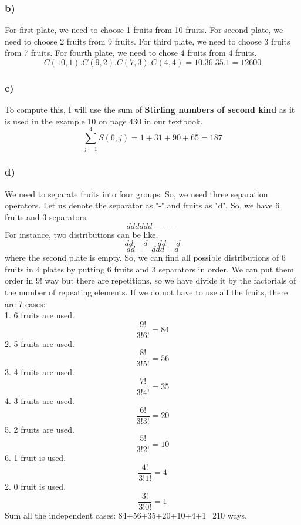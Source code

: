 \documentclass[12pt]{article}
\begin{document}
\subsubsection*{b)}
For first plate, we need to choose 1 fruits from 10 fruits. For second plate, we need to choose 2 fruits from 9 fruits. For third plate, we need to choose 3 fruits from 7 fruits. For fourth plate, we need to chose 4 fruits from 4 fruits.
$$C(10,1).C(9,2).C(7,3).C(4,4)=10.36.35.1=12600$$
\subsubsection*{c)}
To compute this, I will use the sum of \textbf{Stirling numbers of second kind} as it is used in the example 10 on page 430 in our textbook.
$$\sum^4_{j=1}S(6,j)=1+31+90+65=187$$
\subsubsection*{d)}
We need to separate fruits into four groups. So, we need three separation operators. Let us denote the separator as "-" and fruits as "d". So, we have 6 fruits and 3 separators.
$$dddddd---$$
For instance, two distributions can be like,
$$dd-d-dd-d$$
$$dd--ddd-d$$
where the second plate is empty.
So, we can find all possible distributions of 6 fruits in 4 plates by putting 6 fruits and 3 separators in order. We can put them order in 9! way but there are repetitions, so we have divide it by the factorials of the number of repeating elements. If we do not have to use all the fruits, there are 7 cases:\\
1. 6 fruits are used.
$$\dfrac{9!}{3!6!}=84$$
2. 5 fruits are used.
$$\dfrac{8!}{3!5!}=56$$
3. 4 fruits are used.
$$\dfrac{7!}{3!4!}=35$$
4. 3 fruits are used.
$$\dfrac{6!}{3!3!}=20$$
5. 2 fruits are used.
$$\dfrac{5!}{3!2!}=10$$
6. 1 fruit is used.
$$\dfrac{4!}{3!1!}=4$$
2. 0 fruit is used.
$$\dfrac{3!}{3!0!}=1$$
Sum all the independent cases: 84+56+35+20+10+4+1=210 ways.
\end{document}
